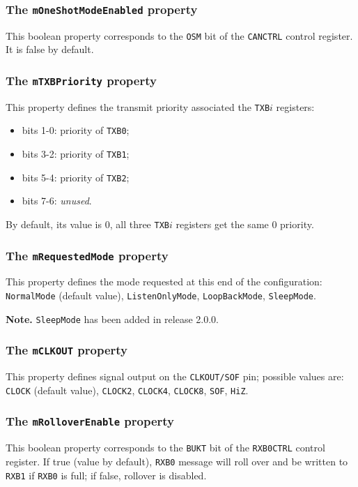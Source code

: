\documentclass[9pt, a4paper, obeyspaces]{extarticle}
\newcommand \subsubsectionLabel[2]{\subsubsection{#1}\label{subsubsec:#2}}
\begin{document}
\subsubsectionLabel{The \texttt{mOneShotModeEnabled} property}{mOneShotModeEnabled}

This boolean property corresponds to the \texttt{OSM} bit of the \texttt{CANCTRL} control register. It is false by default.



\subsubsectionLabel{The \texttt{mTXBPriority} property}{mTXBPriority}

This property defines the transmit priority associated the \texttt{TXB$i$} registers:
\begin{itemize}
  \item bits 1-0: priority of \texttt{TXB0};
  \item bits 3-2: priority of \texttt{TXB1};
  \item bits 5-4: priority of \texttt{TXB2};
  \item bits 7-6: \emph{unused}.
\end{itemize}

By default, its value is $0$, all three \texttt{TXB$i$} registers get the same $0$ priority.



\subsubsectionLabel{The \texttt{mRequestedMode} property}{mRequestedMode}

This property defines the mode requested at this end of the configuration: \texttt{NormalMode} (default value), \texttt{ListenOnlyMode}, \texttt{LoopBackMode}, \texttt{SleepMode}.

{\bf Note. } \texttt{SleepMode} has been added in release 2.0.0.



\subsubsectionLabel{The \texttt{mCLKOUT} property}{mCLKOUT}

This property defines signal output on the \texttt{CLKOUT/SOF} pin; possible values are: \texttt{CLOCK} (default value), \texttt{CLOCK2}, \texttt{CLOCK4}, \texttt{CLOCK8}, \texttt{SOF}, \texttt{HiZ}.



\subsubsectionLabel{The \texttt{mRolloverEnable} property}{mRolloverEnable}

This boolean property corresponds to the \texttt{BUKT} bit of the \texttt{RXB0CTRL} control register. If true (value by default), \texttt{RXB0} message will roll over and be written to \texttt{RXB1} if \texttt{RXB0} is full; if false, rollover is disabled.
\end{document}
